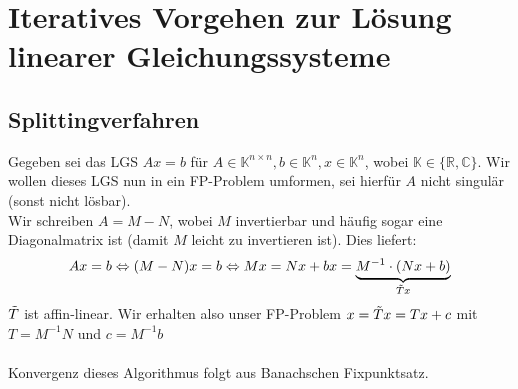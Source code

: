 \documentclass{article}
\begin{document}
\section{Iteratives Vorgehen zur Lösung linearer Gleichungssysteme}
\subsection{Splittingverfahren}
Gegeben sei das LGS $Ax=b$ für $A\in\mathbb{K}^{n\times n}, b\in\mathbb{K}^n, x\in\mathbb{K}^n$, 
wobei $\mathbb{K}\in\{\mathbb{R}, \mathbb{C}\}$. Wir wollen dieses LGS nun in ein FP-Problem umformen, 
sei hierfür $A$ nicht singulär (sonst nicht lösbar). \\
Wir schreiben $A=M-N$, wobei $M$ invertierbar und häufig sogar eine Diagonalmatrix ist 
(damit $M$ leicht zu invertieren ist). Dies liefert:
\[Ax = b \Leftrightarrow (M-N)x=b \Leftrightarrow Mx=Nx+b x=\underbrace{M^{-1}\cdot(Nx+b)}_{\Tilde{T}x}\]
$\Tilde{T}$ ist affin-linear. Wir erhalten also unser FP-Problem $x=\Tilde{T}x=Tx+c$ 
mit $T=M^{-1}N$ und $c=M^{-1}b$ \\ \\

Konvergenz dieses Algorithmus folgt aus Banachschen Fixpunktsatz.
\end{document}
